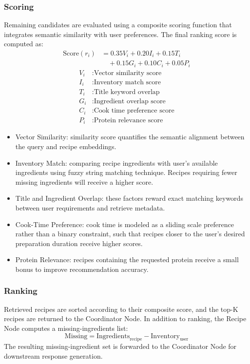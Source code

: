 \documentclass[conference]{IEEEtran}
\begin{document}
\subsubsection{Scoring}
Remaining candidates are evaluated using a composite scoring function that integrates semantic similarity with user preferences. The final ranking score is computed as:
\begin{align}
\mathrm{Score}(r_i) &= 0.35 V_i + 0.20 I_i + 0.15 T_i \nonumber \\
&\quad + 0.15 G_i + 0.10 C_i + 0.05 P_i
\end{align}
\begin{align*}
V_i &: \text{Vector similarity score} \\
I_i &: \text{Inventory match score} \\
T_i &: \text{Title keyword overlap} \\
G_i &: \text{Ingredient overlap score} \\
C_i &: \text{Cook time preference score} \\
P_i &: \text{Protein relevance score}
\end{align*}

\begin{itemize}
    \item Vector Similarity: similarity score quantifies the semantic alignment between the query and recipe embeddings.
    \item Inventory Match: comparing recipe ingredients with user's available ingredients using fuzzy string matching technique. Recipes requiring fewer missing ingredients will receive a higher score.
    \item Title and Ingredient Overlap: these factors reward exact matching keywords between user requirements and retrieve metadata.
    \item Cook-Time Preference: cook time is modeled as a sliding scale preference rather than a binary constraint, such that recipes closer to the user's desired preparation duration receive higher scores.
    \item Protein Relevance: recipes containing the requested protein receive a small bonus to improve recommendation accuracy.
\end{itemize}

\subsubsection{Ranking}
Retrieved recipes are sorted according to their composite score, and the top-K recipes are returned to the Coordinator Node. In addition to ranking, the Recipe Node computes a missing-ingredients list:
\[
\mathrm{Missing} = \mathrm{Ingredients}_{\mathrm{recipe}} - \mathrm{Inventory}_{\mathrm{user}}
\]
The resulting missing-ingredient set is forwarded to the Coordinator Node for downstream response generation. 
\end{document}
